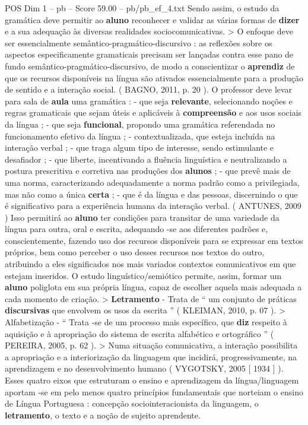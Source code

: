\begin{textsample}{POS Dim 1 – pb – Score 59.00 – pb/pb\_ef\_4.txt}
Sendo assim, o estudo da gramática deve permitir ao \textbf{aluno} reconhecer e validar as várias formas de \textbf{dizer} e a sua adequação às diversas realidades sociocomunicativas. > O enfoque deve ser essencialmente semântico-pragmático-discursivo : as reflexões sobre os aspectos especificamente gramaticais precisam ser lançadas contra esse pano de fundo semântico-pragmático-discursivo, de modo a conscientizar o \textbf{aprendiz} de que os recursos disponíveis na língua são ativados essencialmente para a produção de sentido e a interação social. ( BAGNO, 2011, p. 20 ).
O professor deve levar para sala de \textbf{aula} uma gramática : - que seja \textbf{relevante}, selecionando noções e regras gramaticais que sejam úteis e aplicáveis à \textbf{compreensão} e aos usos sociais da língua ; - que seja \textbf{funcional}, propondo uma gramática referendada no funcionamento efetivo da língua ; - contextualizada, que esteja incluída na interação verbal ; - que traga algum tipo de interesse, sendo estimulante e desafiador ; - que liberte, incentivando a fluência linguística e neutralizando a postura prescritiva e corretiva nas produções dos \textbf{alunos} ; - que prevê mais de uma norma, caracterizando adequadamente a norma padrão como a privilegiada, mas não como a única \textbf{certa} ; - que é da língua e das pessoas, discernindo o que é significativo para a experiência humana da interação verbal. ( ANTUNES, 2009 ) Isso permitirá ao \textbf{aluno} ter condições para transitar de uma variedade da língua para outra, oral e escrita, adequando -se aos diferentes padrões e, conscientemente, fazendo uso dos recursos disponíveis para se expressar em textos próprios, bem como perceber o uso desses recursos nos textos do outro, atribuindo a eles significados nos mais variados contextos comunicativos em que estejam inseridos.
O estudo linguístico/semiótico permite, assim, formar um \textbf{aluno} poliglota em sua própria língua, capaz de escolher aquela mais adequada a cada momento de criação. > \textbf{Letramento} - Trata de “ um conjunto de práticas \textbf{discursivas} que envolvem os usos da escrita ” ( KLEIMAN, 2010, p. 07 ). > Alfabetização - “ Trata -se de um processo mais específico, que \textbf{diz} respeito à aquisição e à apropriação do sistema de escrita alfabético e ortográfico ” ( PEREIRA, 2005, p. 62 ). > Numa situação comunicativa, a interação possibilita a apropriação e a interiorização da linguagem que incidirá, progressivamente, na aprendizagem e no desenvolvimento humano ( VYGOTSKY, 2005 [ 1934 ] ).
Esses quatro eixos que estruturam o ensino e aprendizagem da língua/linguagem aportam -se em pelo menos quatro princípios fundamentais que norteiam o ensino de Língua Portuguesa : concepção sociointeracionista da linguagem, o \textbf{letramento}, o texto e a noção de sujeito aprendente.

\end{textsample}
